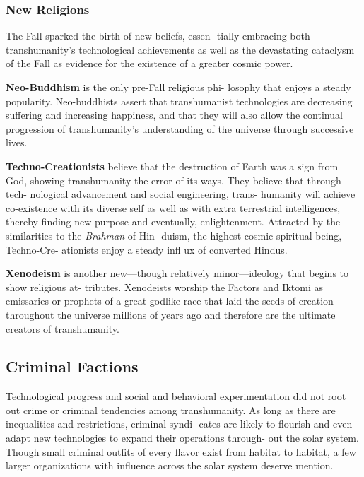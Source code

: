 \subsubsection{New Religions}

The Fall sparked the birth of new beliefs, essen-
tially embracing both transhumanity's technological 
achievements as well as the devastating cataclysm 
of the Fall as evidence for the existence of a greater 
cosmic power.

\textbf{Neo-Buddhism} is the only pre-Fall religious phi-
losophy that enjoys a steady popularity. Neo-buddhists 
assert that transhumanist technologies are decreasing 
suffering and increasing happiness, and that they will 
also allow the continual progression of transhumanity's 
understanding of the universe through successive lives.

\textbf{Techno-Creationists} believe that the destruction of 
Earth was a sign from God, showing transhumanity 
the error of its ways. They believe that through tech-
nological advancement and social engineering, trans-
humanity will achieve co-existence with its diverse self 
as well as with extra terrestrial intelligences, thereby 
finding new purpose and eventually, enlightenment. 
Attracted by the similarities to the \textit{Brahman }of Hin-
duism, the highest cosmic spiritual being, Techno-Cre-
ationists enjoy a steady infl ux of converted Hindus.

\textbf{Xenodeism} is another new—though relatively 
minor—ideology that begins to show religious at-
tributes. Xenodeists worship the Factors and Iktomi 
as emissaries or prophets of a great godlike race that 
laid the seeds of creation throughout the universe 
millions of years ago and therefore are the ultimate 
creators of transhumanity.

\subsection{Criminal Factions}

Technological progress and social and behavioral 
experimentation did not root out crime or criminal 
tendencies among transhumanity. As long as there 
are inequalities and restrictions, criminal syndi-
cates are likely to flourish and even adapt new 
technologies to expand their operations through-
out the solar system. Though small criminal outfits 
of every flavor exist from habitat to habitat, a few 
larger organizations with influence across the solar 
system deserve mention.

